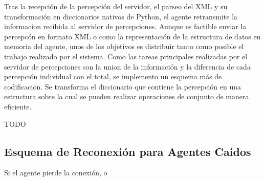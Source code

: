  Tras la recepción de la percepción del servidor, el parseo del XML y
 su transformación en diccionarios nativos de Python, el agente
 retransmite la informacion recibida al servidor de percepciones.
 Aunque es factible enviar la percepcón en formato XML o como la
 representación de la estructura de datos en memoria del agente, unos
 de los objetivos es distribuir tanto como posible el trabajo realizado
 por el sistema.
 Como las tareas principales realizadas por el servidor de percepciones 
 son la union de la información y la diferencia de cada percepción 
 individual con el total, se implemento un esquema más de codificacion. 
 Se transforma el diccionario que contiene la percepción en una 
 estructura sobre la cual se pueden realizar operaciones de conjunto de 
 manera eficiente. 
 
TODO

\subsection{Esquema de Reconexión para Agentes Caidos}

Si el agente pierde la conexión, o 
